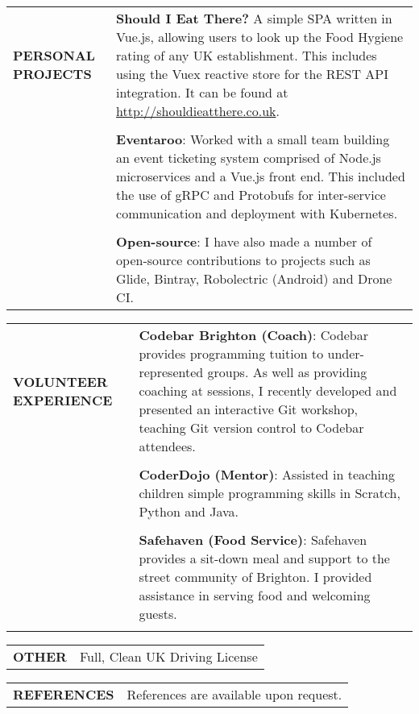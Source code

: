 \documentclass[7pt]{article}
\begin{document}
\begin{tabular}{@{} p{} p{}}
  \textbf{PERSONAL PROJECTS} & \textbf{Should I Eat There?} A simple SPA written in Vue.js, allowing users to look up the Food Hygiene rating of any UK establishment. This includes using the Vuex reactive store for the REST API integration. It can be found at \href{http://shouldieatthere.co.uk}{http://shouldieatthere.co.uk}. \\
  & \\
  & \textbf{Eventaroo}: Worked with a small team building an event ticketing system comprised of Node.js microservices and a Vue.js front end. This included the use of gRPC and Protobufs for inter-service communication and deployment with Kubernetes. \\
  & \\
  & \textbf{Open-source}: I have also made a number of open-source contributions to projects such as Glide, Bintray, Robolectric (Android) and Drone CI.
\end{tabular}

\vspace{0.25in}

\begin{tabular}{@{} p{} p{}}
  \textbf{VOLUNTEER EXPERIENCE} & \textbf{Codebar Brighton (Coach)}: Codebar provides programming tuition to under-represented groups. As well as providing coaching at sessions, I recently developed and presented an interactive Git workshop, teaching Git version control to Codebar attendees. \\
  & \\
  & \textbf{CoderDojo (Mentor)}: Assisted in teaching children simple programming skills in Scratch, Python and Java. \\
  & \\
  & \textbf{Safehaven (Food Service)}: Safehaven provides a sit-down meal and support to the street community of Brighton. I provided assistance in serving food and welcoming guests.\\
  & \\
\end{tabular}

\vspace{0.25in}

\begin{tabular}{@{} p{} p{}}
  \textbf{OTHER} & Full, Clean UK Driving License
\end{tabular}

\vspace{0.25in}

\begin{tabular}{@{} p{} p{}}
  \textbf{REFERENCES} & References are available upon request.
\end{tabular}

\bigskip
\end{document}
